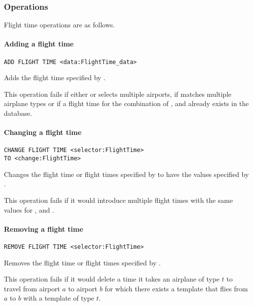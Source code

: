 \subsubsection{Operations}
Flight time operations are as follows.

\paragraph{Adding a flight time}
\begin{operation}
  \lstinline{ADD FLIGHT TIME <data:FlightTime_data>}
  \label{op:add_flighttime}
\end{operation}
Adds the flight time specified by .

This operation fails if either  or  selects multiple
airports, if  matches multiple airplane types or if a flight time
for the combination of ,  and  already
exists in the database.

\paragraph{Changing a flight time}
\begin{operation}
  \begin{lstlisting}
CHANGE FLIGHT TIME <selector:FlightTime>
TO <change:FlightTime>
  \end{lstlisting}
  \label{op:change_flighttime}
\end{operation}
Changes the flight time or flight times specified by  to have the
values specified by .

This operation fails if it would introduce multiple flight times  with the same
values for ,  and .

\paragraph{Removing a flight time}
\begin{operation}
  \lstinline{REMOVE FLIGHT TIME <selector:FlightTime>}
  \label{op:remove_flighttime}
\end{operation}
Removes the flight time or flight times specified by .

This operation fails if it would delete a time it takes an airplane of type $t$
to travel from airport $a$ to airport $b$ for which there exists a template that
flies from $a$ to $b$ with a template of type $t$.

